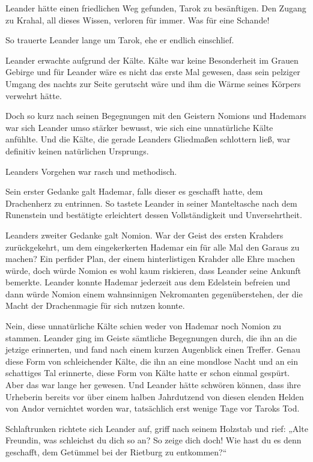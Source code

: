 \documentclass[10pt, a4paper, oneside]{book}
\begin{document}
Leander hätte einen friedlichen Weg gefunden, Tarok zu besänftigen. Den Zugang zu Krahal, all dieses Wissen, verloren für immer. Was für eine Schande!

So trauerte Leander lange um Tarok, ehe er endlich einschlief.\bigskip







Leander erwachte aufgrund der Kälte. Kälte war keine Besonderheit im Grauen Gebirge und für Leander wäre es nicht das erste Mal gewesen, dass sein pelziger Umgang des nachts zur Seite gerutscht wäre und ihm die Wärme seines Körpers verwehrt hätte.

Doch so kurz nach seinen Begegnungen mit den Geistern Nomions und Hademars war sich Leander umso stärker bewusst, wie sich eine unnatürliche Kälte anfühlte. Und die Kälte, die gerade Leanders Gliedmaßen schlottern ließ, war definitiv keinen natürlichen Ursprungs.

Leanders Vorgehen war rasch und methodisch.

Sein erster Gedanke galt Hademar, falls dieser es geschafft hatte, dem Drachenherz zu entrinnen. So tastete Leander in seiner Manteltasche nach dem Runenstein und bestätigte erleichtert dessen Vollständigkeit und Unversehrtheit.

Leanders zweiter Gedanke galt Nomion. War der Geist des ersten Krahders zurückgekehrt, um dem eingekerkerten Hademar ein für alle Mal den Garaus zu machen? Ein perfider Plan, der einem hinterlistigen Krahder alle Ehre machen würde, doch würde Nomion es wohl kaum riskieren, dass Leander seine Ankunft bemerkte. Leander konnte Hademar jederzeit aus dem Edelstein befreien und dann würde Nomion einem wahnsinnigen Nekromanten gegenüberstehen, der die Macht der Drachenmagie für sich nutzen konnte.

Nein, diese unnatürliche Kälte schien weder von Hademar noch Nomion zu stammen. Leander ging im Geiste sämtliche Begegnungen durch, die ihn an die jetzige erinnerten, und fand nach einem kurzen Augenblick einen Treffer. Genau diese Form von schleichender Kälte, die ihn an eine mondlose Nacht und an ein schattiges Tal erinnerte, diese Form von Kälte hatte er schon einmal gespürt. Aber das war lange her gewesen. Und Leander hätte schwören können, dass ihre Urheberin bereits vor über einem halben Jahrdutzend von diesen elenden Helden von Andor vernichtet worden war, tatsächlich erst wenige Tage vor Taroks Tod.

Schlaftrunken richtete sich Leander auf, griff nach seinem Holzstab und rief: „Alte Freundin, was schleichst du dich so an? So zeige dich doch! Wie hast du es denn geschafft, dem Getümmel bei der Rietburg zu entkommen?“
\end{document}
